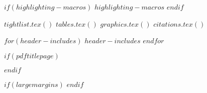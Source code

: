 
$if(highlighting-macros)$
$highlighting-macros$
$endif$

$tightlist.tex()$
$tables.tex()$
$graphics.tex()$
$citations.tex()$

$for(header-includes)$
$header-includes$
$endfor$


\usepackage[tikz]{bclogo}
\newenvironment{Summary}
  {\begin{bclogo}[logo=\bctrombone, noborder=true, couleur=lightgray!50]{$chaptersummary$}\parindent0pt}
  {\end{bclogo}}
%


$if(pdftitlepage)$
\usepackage{pdfpages}
$endif$

$if(largemargins)$
\captionnamefont{\scriptsize}
\captiontitlefont{\scriptsize}
\renewcommand{\footnotesize}{\tiny}
$endif$

\usepackage{titletoc}
\newcommand{\toc}[1]{%
  \startcontents[chapters]%
  \printcontents[chapters]{}{1}[#1]{}%
  ~\newline%
}





\newcommand{\MemoirChapStyle}{$MemoirChapStyle$}
\newcommand{\MemoirPageStyle}{$MemoirPageStyle$}

\usepackage{parskip}
  \abnormalparskip{3pt}

\usepackage{marginfix}



